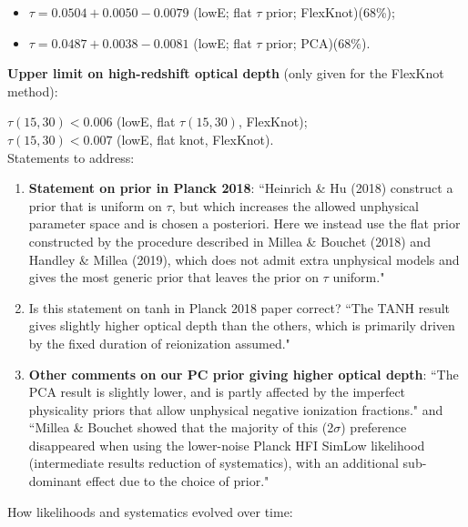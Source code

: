 \documentclass[prd,twocolumn,amsmath,amssymb,floatfix,superscriptaddress,nofootinbib]{revtex4-1}
\begin{document}
{\begin{itemize}
\item $\tau = 0.0504+0.0050
-0.0079$ (lowE; flat $\tau$ prior; FlexKnot)(68\%); \\

\item $\tau = 0.0487+0.0038
-0.0081$ (lowE; flat $\tau$ prior; PCA)(68\%).

\end{itemize}

\textbf{Upper limit on high-redshift optical depth} (only given for the FlexKnot method):

$\tau(15, 30) < 0.006$ (lowE, flat $\tau(15, 30)$, FlexKnot); \\

$\tau(15, 30) < 0.007$ (lowE, flat knot, FlexKnot).\\

Statements to address:

\begin{enumerate}
    \item {\textbf{Statement on prior in Planck 2018}:  ``Heinrich \& Hu (2018) construct a prior that is uniform on $\tau$, but which increases the allowed unphysical parameter space and is chosen a posteriori. Here we instead use the flat prior constructed by the procedure described in Millea \& Bouchet (2018) and Handley \& Millea (2019), which does not admit extra unphysical models and gives the most generic prior that leaves the prior on $\tau$ uniform."}
    
    \item {Is this statement on tanh in Planck 2018 paper correct?} ``The TANH result gives slightly higher optical depth than the others, which is primarily driven by the fixed duration of reionization assumed." \\
    
    \item{\textbf{Other comments on our PC prior giving higher optical depth}: ``The PCA result is slightly lower, and is partly affected by the imperfect physicality priors that allow unphysical negative ionization fractions." and ``Millea \& Bouchet showed that the majority of this (2$\sigma$) preference disappeared when using the lower-noise Planck HFI SimLow likelihood (intermediate results reduction of systematics), with an additional sub-dominant effect due to the choice of prior."}
    
\end{enumerate}

How likelihoods and systematics evolved over time:

}
\end{document}
